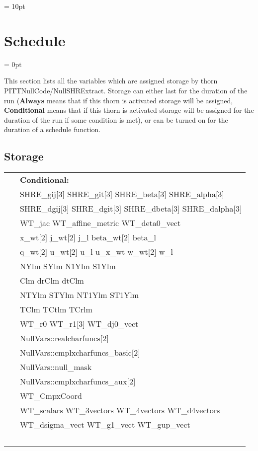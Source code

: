 \vspace{5mm}\parskip = 10pt 

\section{Schedule} 


\parskip = 0pt


\noindent This section lists all the variables which are assigned storage by thorn PITTNullCode/NullSHRExtract.  Storage can either last for the duration of the run ({\bf Always} means that if this thorn is activated storage will be assigned, {\bf Conditional} means that if this thorn is activated storage will be assigned for the duration of the run if some condition is met), or can be turned on for the duration of a schedule function.


\subsection*{Storage}

\hspace{5mm}

 \begin{tabular*}{160mm}{ll} 
~& {\bf Conditional:} \\ 
~ &  SHRE\_gij[3] SHRE\_git[3] SHRE\_beta[3] SHRE\_alpha[3]\\ 
~ &  SHRE\_dgij[3] SHRE\_dgit[3] SHRE\_dbeta[3] SHRE\_dalpha[3]\\ 
~ &  WT\_jac WT\_affine\_metric WT\_deta0\_vect\\ 
~ &  x\_wt[2] j\_wt[2] j\_l beta\_wt[2] beta\_l\\ 
~ &  q\_wt[2] u\_wt[2] u\_l u\_x\_wt w\_wt[2] w\_l\\ 
~ &  NYlm SYlm N1Ylm S1Ylm\\ 
~ &  Clm drClm dtClm\\ 
~ &  NTYlm STYlm NT1Ylm ST1Ylm\\ 
~ &  TClm TCtlm TCrlm\\ 
~ &  WT\_r0 WT\_r1[3] WT\_dj0\_vect\\ 
~ &  NullVars::realcharfuncs[2]\\ 
~ &  NullVars::cmplxcharfuncs\_basic[2]\\ 
~ &  NullVars::null\_mask\\ 
~ &  NullVars::cmplxcharfuncs\_aux[2]\\ 
~ &  WT\_CmpxCoord\\ 
~ &  WT\_scalars WT\_3vectors WT\_4vectors WT\_d4vectors\\ 
~ &  WT\_dsigma\_vect WT\_g1\_vect WT\_gup\_vect\\ 
~ & ~\\ 
\end{tabular*} 


